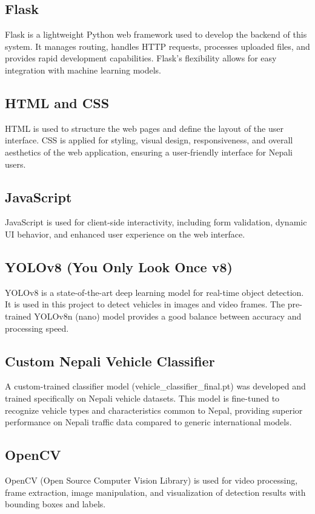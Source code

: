 \documentclass[12pt,a4paper]{report}
\begin{document}
\subsection{Flask}
Flask is a lightweight Python web framework used to develop the backend of this system. It manages routing, handles HTTP requests, processes uploaded files, and provides rapid development capabilities. Flask's flexibility allows for easy integration with machine learning models.

\subsection{HTML and CSS}
HTML is used to structure the web pages and define the layout of the user interface. CSS is applied for styling, visual design, responsiveness, and overall aesthetics of the web application, ensuring a user-friendly interface for Nepali users.

\subsection{JavaScript}
JavaScript is used for client-side interactivity, including form validation, dynamic UI behavior, and enhanced user experience on the web interface.

\subsection{YOLOv8 (You Only Look Once v8)}
YOLOv8 is a state-of-the-art deep learning model for real-time object detection. It is used in this project to detect vehicles in images and video frames. The pre-trained YOLOv8n (nano) model provides a good balance between accuracy and processing speed.

\subsection{Custom Nepali Vehicle Classifier}
A custom-trained classifier model (vehicle\_classifier\_final.pt) was developed and trained specifically on Nepali vehicle datasets. This model is fine-tuned to recognize vehicle types and characteristics common to Nepal, providing superior performance on Nepali traffic data compared to generic international models.

\subsection{OpenCV}
OpenCV (Open Source Computer Vision Library) is used for video processing, frame extraction, image manipulation, and visualization of detection results with bounding boxes and labels.
\end{document}
